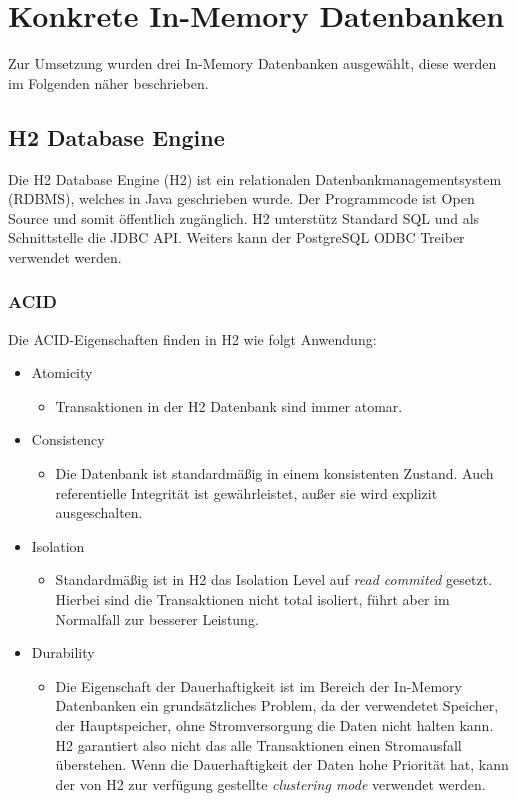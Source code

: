 \documentclass[draft,final]{vutinfth} %
\begin{document}
\section{Konkrete In-Memory Datenbanken}
Zur Umsetzung wurden drei In-Memory Datenbanken ausgewählt, diese werden im Folgenden näher beschrieben.

\subsection{H2 Database Engine}

Die H2 Database Engine (H2) ist ein relationalen Datenbankmanagementsystem (RDBMS), welches in Java geschrieben wurde. Der Programmcode ist Open Source und somit öffentlich zugänglich. H2 unterstütz Standard SQL und als Schnittstelle die JDBC API. Weiters kann der PostgreSQL ODBC Treiber verwendet werden.

\subsubsection*{ACID}
Die ACID-Eigenschaften finden in H2 wie folgt Anwendung:
\begin{itemize}
	\item Atomicity
	\begin{itemize}
		\item Transaktionen in der H2 Datenbank sind immer atomar.
	\end{itemize}
	\item Consistency
	\begin{itemize}
		\item Die Datenbank ist standardmä{\ss}ig in einem konsistenten Zustand. Auch referentielle Integrität ist gewährleistet, au\ss er sie wird explizit ausgeschalten.
	\end{itemize}
	\item Isolation
	\begin{itemize}
		\item Standardmä{\ss}ig ist in H2 das Isolation Level auf \textit{read commited} gesetzt. Hierbei sind die Transaktionen nicht total isoliert, führt aber im Normalfall zur besserer Leistung.
	\end{itemize}
	\item Durability
	\begin{itemize}
		\item Die Eigenschaft der Dauerhaftigkeit ist im Bereich der In-Memory Datenbanken ein grundsätzliches Problem, da der verwendetet Speicher, der Hauptspeicher, ohne Stromversorgung die Daten nicht halten kann. H2 garantiert also nicht das alle Transaktionen einen Stromausfall überstehen. Wenn die Dauerhaftigkeit der Daten hohe Priorität hat, kann der von H2 zur verfügung gestellte \textit{clustering mode} verwendet werden. 
	\end{itemize}
\end{itemize}
\end{document}
